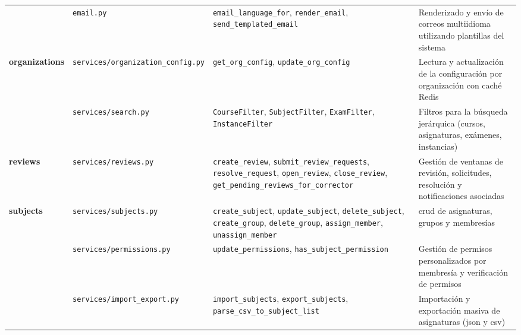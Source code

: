 \begin{longtable}{p{1.8cm} p{3.2cm} p{4.5cm} p{4.5cm}}
& \texttt{email.py}
& \texttt{email\_language\_for}, \texttt{render\_email}, \texttt{send\_templated\_email}
& Renderizado y envío de correos multiidioma utilizando plantillas del sistema \\

\textbf{organizations}
& \texttt{services/organization\_config.py}
& \texttt{get\_org\_config}, \texttt{update\_org\_config}
& Lectura y actualización de la configuración por organización con caché Redis \\

& \texttt{services/search.py}
& \texttt{CourseFilter}, \texttt{SubjectFilter}, \texttt{ExamFilter}, \texttt{InstanceFilter}
& Filtros para la búsqueda jerárquica (cursos, asignaturas, exámenes, instancias) \\

\textbf{reviews}
& \texttt{services/reviews.py}
& \texttt{create\_review}, \texttt{submit\_review\_requests}, \texttt{resolve\_request}, \texttt{open\_review}, \texttt{close\_review}, \texttt{get\_pending\_reviews\_for\_corrector}
& Gestión de ventanas de revisión, solicitudes, resolución y notificaciones asociadas \\

\textbf{subjects}
& \texttt{services/subjects.py}
& \texttt{create\_subject}, \texttt{update\_subject}, \texttt{delete\_subject}, \texttt{create\_group}, \texttt{delete\_group}, \texttt{assign\_member}, \texttt{unassign\_member}
& \acs{crud} de asignaturas, grupos y membresías \\

& \texttt{services/permissions.py}
& \texttt{update\_permissions}, \texttt{has\_subject\_permission}
& Gestión de permisos personalizados por membresía y verificación de permisos \\

& \texttt{services/import\_export.py}
& \texttt{import\_subjects}, \texttt{export\_subjects}, \texttt{parse\_csv\_to\_subject\_list}
& Importación y exportación masiva de asignaturas (\acs{json} y \acs{csv}) \\

\end{longtable}
\endgroup
